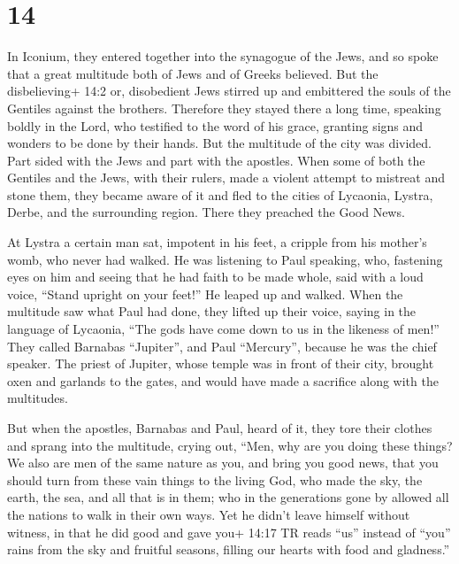 \hypertarget{section-13}{%
\section{14}\label{section-13}}

 In Iconium, they entered together into the synagogue of the
Jews, and so spoke that a great multitude both of Jews and of Greeks
believed.  But the disbelieving+ 14:2 or, disobedient Jews
stirred up and embittered the souls of the Gentiles against the
brothers.  Therefore they stayed there a long time, speaking
boldly in the Lord, who testified to the word of his grace, granting
signs and wonders to be done by their hands.  But the
multitude of the city was divided. Part sided with the Jews and part
with the apostles.  When some of both the Gentiles and the
Jews, with their rulers, made a violent attempt to mistreat and stone
them,  they became aware of it and fled to the cities of
Lycaonia, Lystra, Derbe, and the surrounding region.  There
they preached the Good News.

 At Lystra a certain man sat, impotent in his feet, a
cripple from his mother's womb, who never had walked.  He
was listening to Paul speaking, who, fastening eyes on him and seeing
that he had faith to be made whole,  said with a loud
voice, ``Stand upright on your feet!'' He leaped up and walked.
 When the multitude saw what Paul had done, they lifted up
their voice, saying in the language of Lycaonia, ``The gods have come
down to us in the likeness of men!''  They called Barnabas
``Jupiter'', and Paul ``Mercury'', because he was the chief speaker.
 The priest of Jupiter, whose temple was in front of their
city, brought oxen and garlands to the gates, and would have made a
sacrifice along with the multitudes.

 But when the apostles, Barnabas and Paul, heard of it,
they tore their clothes and sprang into the multitude, crying out,
 ``Men, why are you doing these things? We also are men of
the same nature as you, and bring you good news, that you should turn
from these vain things to the living God, who made the sky, the earth,
the sea, and all that is in them;  who in the generations
gone by allowed all the nations to walk in their own ways. 
Yet he didn't leave himself without witness, in that he did good and
gave you+ 14:17 TR reads ``us'' instead of ``you'' rains from the sky
and fruitful seasons, filling our hearts with food and gladness.''

